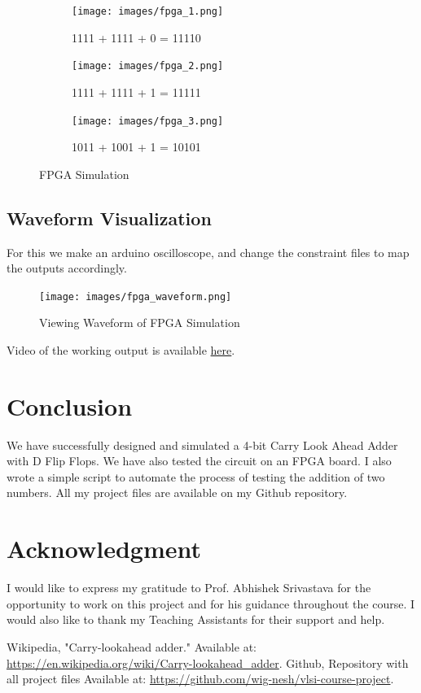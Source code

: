 \documentclass[conference]{IEEEtran}
\begin{document}
\begin{figure}[H]
    \centering
    \begin{subfigure}{0.4\textwidth}
        \texttt{[image: images/fpga\_1.png]}
        \caption{1111 + 1111 + 0 = 11110}
    \end{subfigure}
    \hfill
    \begin{subfigure}{0.4\textwidth}
        \texttt{[image: images/fpga\_2.png]}
        \caption{1111 + 1111 + 1 = 11111}
    \end{subfigure}
    \hfill
    \begin{subfigure}{0.4\textwidth}
        \texttt{[image: images/fpga\_3.png]}
        \caption{1011 + 1001 + 1 = 10101}
    \end{subfigure}
    
    \caption{FPGA Simulation}
\end{figure}

\subsection{Waveform Visualization}

For this we make an arduino oscilloscope, and change the constraint files to map the outputs accordingly.

\begin{figure}[H]
    \centering
    \texttt{[image: images/fpga\_waveform.png]}
    \caption{Viewing Waveform of FPGA Simulation}
\end{figure}

Video of the working output is available \href{https://iiitaphyd-my.sharepoint.com/:f:/g/personal/vigneshvembar_m_students_iiit_ac_in/Ek1zK19mmwBGhRlQdIGQBK4By9x6MJ-vOQfoJsAwDm6LJg?e=6zw7ME}{here}.

\section{Conclusion}
We have successfully designed and simulated a 4-bit Carry Look Ahead Adder with D Flip Flops. We have also tested the circuit on an FPGA board. 
I also wrote a simple script to automate the process of testing the addition of two numbers. All my project files are available on my Github repository. \cite{b2}

\section*{Acknowledgment}
I would like to express my gratitude to Prof. Abhishek Srivastava for the opportunity to work on this project and for his guidance throughout the course. I would also like to thank my Teaching Assistants for their support and help.

\begin{thebibliography}{00}
     Wikipedia, "Carry-lookahead adder." Available at: \url{https://en.wikipedia.org/wiki/Carry-lookahead_adder}.
     Github, Repository with all project files Available at: \url{https://github.com/wig-nesh/vlsi-course-project}.
\end{thebibliography}
    
\end{document}
